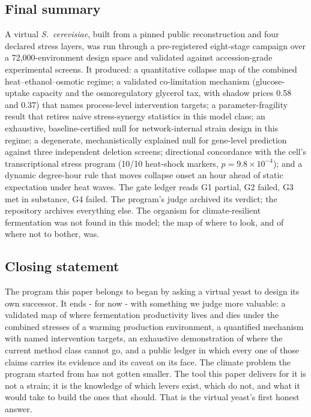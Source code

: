 \documentclass[12pt]{article}
\begin{document}
\subsection{Final summary}

A virtual \emph{S.\ cerevisiae}, built from a pinned public
reconstruction and four declared stress layers, was run through a
pre-registered eight-stage campaign over a 72{,}000-environment
design space and validated against accession-grade experimental
screens. It produced: a quantitative collapse map of the combined
heat--ethanol--osmotic regime; a validated co-limitation mechanism
(glucose-uptake capacity and the osmoregulatory glycerol tax, with
shadow prices 0.58 and 0.37) that names process-level intervention
targets; a parameter-fragility result that retires naive
stress-synergy statistics in this model class; an exhaustive,
baseline-certified null for network-internal strain design in this
regime; a degenerate, mechanistically explained null for gene-level
prediction against three independent deletion screens; directional
concordance with the cell's transcriptional stress program
(10/10 heat-shock markers, $p=9.8\times10^{-4}$); and a dynamic
degree-hour rule that moves collapse onset an hour ahead of static
expectation under heat waves. The gate ledger reads G1 partial, G2
failed, G3 met in substance, G4 failed. The program's judge archived
its verdict; the repository archives everything else. The organism
for climate-resilient fermentation was not found in this model; the
map of where to look, and of where not to bother, was.

\subsection{Closing statement}

The program this paper belongs to began by asking a virtual yeast to
design its own successor. It ends - for now - with something we judge
more valuable: a validated map of where fermentation productivity
lives and dies under the combined stresses of a warming production
environment, a quantified mechanism with named intervention targets,
an exhaustive demonstration of where the current method class cannot
go, and a public ledger in which every one of those claims carries
its evidence and its caveat on its face. The climate problem the
program started from has not gotten smaller. The tool this paper
delivers for it is not a strain; it is the knowledge of which levers
exist, which do not, and what it would take to build the ones that
should. That is the virtual yeast's first honest answer.
\end{document}
